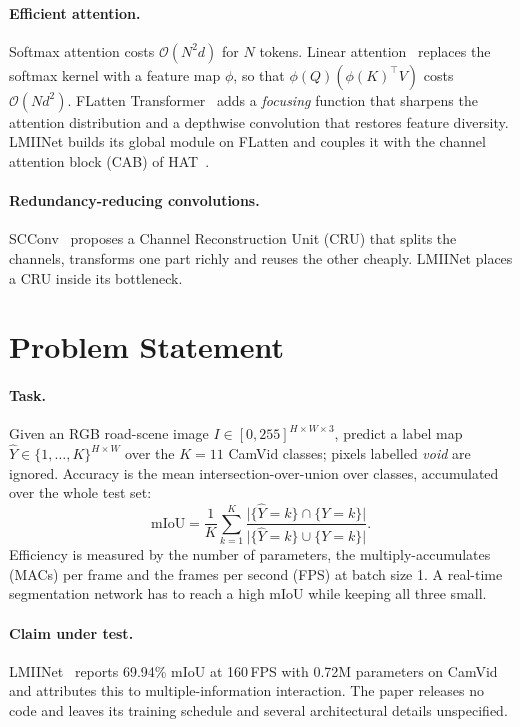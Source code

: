 \documentclass{article}
\begin{document}
\paragraph{Efficient attention.} Softmax attention costs $\mathcal{O}(N^2d)$ for $N$ tokens.
Linear attention~\cite{katharopoulos2020transformers} replaces the softmax kernel with a feature map
$\phi$, so that $\phi(Q)(\phi(K)^\top V)$ costs $\mathcal{O}(Nd^2)$. FLatten
Transformer~\cite{han2023flatten} adds a \emph{focusing} function that sharpens the attention
distribution and a depthwise convolution that restores feature diversity. LMIINet builds its
global module on FLatten and couples it with the channel attention block (CAB) of
HAT~\cite{chen2023hat}.

\paragraph{Redundancy-reducing convolutions.} SCConv~\cite{li2023scconv} proposes a Channel
Reconstruction Unit (CRU) that splits the channels, transforms one part richly and reuses the
other cheaply. LMIINet places a CRU inside its bottleneck.

\section{Problem Statement}
\label{sec:problem}

\paragraph{Task.} Given an RGB road-scene image $I \in [0,255]^{H\times W\times 3}$, predict a label
map $\hat{Y} \in \{1,\dots,K\}^{H\times W}$ over the $K=11$ CamVid classes; pixels labelled
\emph{void} are ignored. Accuracy is the mean intersection-over-union over classes, accumulated over
the whole test set:
\begin{equation}
\mathrm{mIoU} = \frac{1}{K}\sum_{k=1}^{K}
\frac{\lvert\{\hat{Y}=k\}\cap\{Y=k\}\rvert}{\lvert\{\hat{Y}=k\}\cup\{Y=k\}\rvert}.
\end{equation}
Efficiency is measured by the number of parameters, the multiply-accumulates (MACs) per frame and
the frames per second (FPS) at batch size 1. A real-time segmentation network has to reach a high
mIoU while keeping all three small.

\paragraph{Claim under test.} LMIINet~\cite{qiu2024lmiinet} reports 69.94\% mIoU at 160\,FPS with
0.72M parameters on CamVid and attributes this to multiple-information interaction. The paper
releases no code and leaves its training schedule and several architectural details unspecified.
\end{document}
